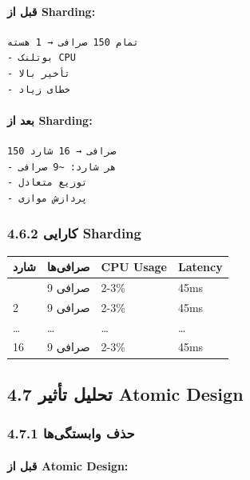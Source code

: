 \documentclass[
]{article}
\newcounter{none} %
\begin{document}
\paragraph{قبل از Sharding:}\label{ux642ux628ux644-ux627ux632-sharding}

\begin{verbatim}
تمام 150 صرافی → 1 هسته
- بوتلنک CPU
- تأخیر بالا
- خطای زیاد
\end{verbatim}

\paragraph{بعد از Sharding:}\label{ux628ux639ux62f-ux627ux632-sharding}

\begin{verbatim}
150 صرافی → 16 شارد
- هر شارد: ~9 صرافی
- توزیع متعادل
- پردازش موازی
\end{verbatim}

\subsubsection{4.6.2 کارایی
Sharding}\label{ux6a9ux627ux631ux627ux6ccux6cc-sharding}

{\def\LTcaptype{none} %
\begin{longtable}[]{@{}llll@{}}
\toprule\noalign{}
شارد & صرافی‌ها & CPU Usage & Latency \\
\midrule\noalign{}
\endhead
\bottomrule\noalign{}
\endlastfoot
1 & 9 صرافی & 2-3\% & 45ms \\
2 & 9 صرافی & 2-3\% & 45ms \\
\ldots{} & \ldots{} & \ldots{} & \ldots{} \\
16 & 9 صرافی & 2-3\% & 45ms \\
\end{longtable}
}

\subsection{4.7 تحلیل تأثیر Atomic
Design}\label{ux62aux62dux644ux6ccux644-ux62aux623ux62bux6ccux631-atomic-design}

\subsubsection{4.7.1 حذف
وابستگی‌ها}\label{ux62dux630ux641-ux648ux627ux628ux633ux62aux6afux6ccux647ux627}

\paragraph{قبل از Atomic
Design:}\label{ux642ux628ux644-ux627ux632-atomic-design}
\end{document}
